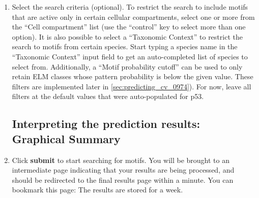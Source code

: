 \documentclass[12pt]{article}
\newcommand\button[1]{%
	\textbf{#1}%
}
\begin{document}
\begin{enumerate}
	\item Select the search criteria (optional). 
		To restrict the search to include
		motifs that are active only in certain cellular compartments, select one or
		more from the ``Cell compartment'' list (use the ``control'' key to select more than one
		option). It is also possible to select a ``Taxonomic Context'' to
		restrict the search to motifs from certain species. Start typing a
		species name in the ``Taxonomic Context'' input field to get an
		auto-completed list of species to select from. Additionally, a ``Motif
		probability cutoff'' can be used to only retain ELM classes whose
		pattern probability is below the given value.
		These filters are implemented later in \ref{sec:predicting_cv_0974}).
		For now, leave all filters at the default values that were
		auto-populated for p53. 



	\subsection*{Interpreting the prediction results: Graphical Summary}
	\label{sec:predicting_p53_graphical_summary}

	\item \label{sec:predicting_p53_submit} Click \button{submit} to start
		searching for motifs. You will be brought to an intermediate page
		indicating that your results are being processed, and should be
		redirected to the final results page within a minute. You can bookmark
		this page: The results are stored for a week.



\end{enumerate}
\end{document}
